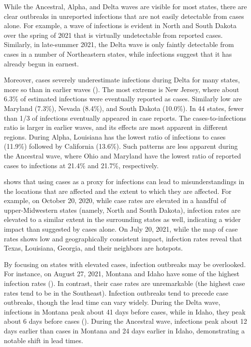 While the Ancestral, Alpha, and Delta waves are visible for most states, there
are clear outbreaks in unreported infections that are not easily detectable from
cases alone. For example, a wave of infections is evident in North and South
Dakota over the spring of 2021 that is virtually undetectable from reported
cases. Similarly, in late-summer 2021, the Delta wave is only faintly
detectable from cases in a number of Northeastern states, while infections
suggest that it has already begun in earnest.  

Moreover, cases severely underestimate infections during Delta for many states,
more so than in earlier waves (). The most extreme is
New Jersey, where about 6.3\% of estimated infections were eventually reported
as cases. Similarly low are Maryland (7.3\%), Nevada (8.4\%), and South Dakota
(10.0\%). In 44 states, fewer than 1/3 of infections eventually appeared in case
reports. The cases-to-infections ratio is larger in earlier waves, and its
effects are most apparent in different regions. During Alpha, Louisiana has the
lowest ratio of infections to cases (11.9\%) followed by California (13.6\%).
Such patterns are less apparent during the Ancestral wave, where Ohio and
Maryland have the lowest ratio of reported cases to infections at 21.4\% and
21.7\%, respectively. 

 shows that using cases as a proxy for infections
can lead to misunderstandings in the locations that are affected and the extent
to which they are affected. For example, on October 20, 2020, while case rates
are elevated in a handful of upper-Midwestern states (namely, North and South
Dakota), infection rates are elevated to a similar extent in the surrounding
states as well, indicating a wider impact than suggested by cases alone. On July
20, 2021, while the map of case rates shows low and geographically consistent
impact, infection rates reveal that Texas, Louisiana, Georgia, and their
neighbors are hotspots. 
 
By focusing on states with elevated cases, infection outbreaks may be
overlooked. For instance, on August 27, 2021, Montana and Idaho have some of the
highest infection rates (). In contrast, their
case rates are unremarkable (the highest case rates tend to be in the
Southeast). Infection outbreaks tend to precede case outbreaks, though the lead
time can vary widely. During the Delta wave, infections in Montana peak about 41
days before cases, while in Idaho, they peak about 6 days before cases
(). During the Ancestral wave, infections peak about
12 days earlier than cases in Montana and 24 days earlier in Idaho,
demonstrating a notable shift in lead times.

